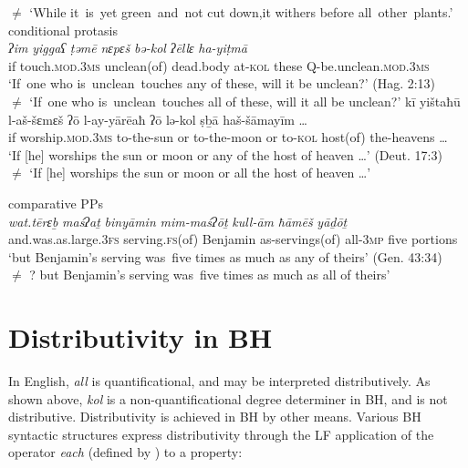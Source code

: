 \documentclass[output=paper]{langsci/langscibook}
\begin{document}
        ${\neq}$  `While it~is~yet green~and~not cut down,it withers before all~other~plants.'
\ex %
    conditional protasis\label{ex:doron:43}\\
    \ea
    \gll \textit{ʔim}    \textit{yiggaʕ}                 \textit{ṭəmē}             \textit{nɛpɛš}          \textit{bə-kol}   \textit{ʔēllɛ}  \textit{ha-yiṭmā}\\
         if       touch.\textsc{mod.3ms}   unclean(of)  dead.body  at-\textsc{kol} these  Q-be.unclean\textsc{.mod.3ms}   \\
    \glt `If~one who is~unclean~touches any of these, will it be unclean?' (Hag. 2:13)\\
        ${\neq}$   `If~one who is~unclean~touches all of these, will it all be unclean?'
    \ex
    \gll kī yištaħū l-aš{}-šɛmɛš  ʔō  l-ay-yārēaħ  ʔō   lə-kol   ṣḇā         haš{}-šāmayīm  …\\
         if  worship.\textsc{mod.3ms}  to-the-sun  or  to-the-moon  or  to-\textsc{kol} host(of) the-heavens  … \\
    \glt `If [he] worships the sun or moon or any of the host of heaven …' (Deut. 17:3)\\
        ${\neq}$   `If [he] worships the sun or moon or all the host of heaven …'
    \z
\z

\ea%
comparative PPs\label{ex:doron:44}\\
\gll  \textit{wat.tērɛḇ}                     \textit{ma}\textit{ś}\textit{ʔaṯ}           \textit{binyāmin}   \textit{mim-ma}\textit{ś}\textit{ʔōṯ}      \textit{kull-ām} \textit{ħāmēš} \textit{yāḏōṯ}\\
and.was.as.large.3\textsc{fs}  serving.\textsc{fs}(of) Benjamin  as-servings(of) all-\textsc{3mp}  five     portions\\
\glt `but Benjamin’s serving was~five times as much as any of theirs' (Gen. 43:34)\\
    ${\neq}$ ? but Benjamin’s serving was~five times as much as all of theirs'
\z

\section{Distributivity in BH}\label{sec:doron:4}%

In English, \textit{all} is quantificational, and may be interpreted distributively.  \linebreak As shown above, \textit{kol} is a non-quantificational degree determiner in BH, and is not distributive. Distributivity is achieved in BH by other means. Various BH syntactic structures express distributivity through the LF application of the operator \textit{each} (defined by \citealt{Link1987}) to a property:
\end{document}
